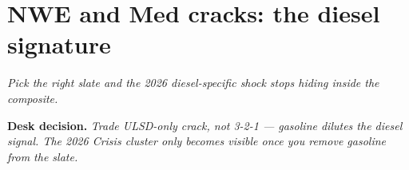 \documentclass[10pt,a4paper]{article}
\begin{document}
\newpage

\section{\mbox{NWE} and Med cracks: the diesel signature}\label{sec:6}

\textit{Pick the right slate and the 2026 diesel-specific shock stops hiding inside the composite.}

\noindent\textcolor{obred}{\textbf{Desk decision.}} \emph{Trade ULSD-only crack, not 3-2-1 --- gasoline dilutes the diesel signal. The 2026 Crisis cluster only becomes visible once you remove gasoline from the slate.}

\vspace{0.2cm}
\end{document}
